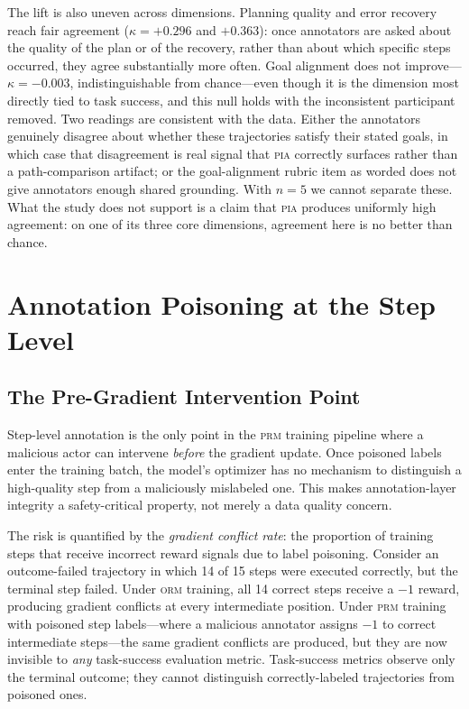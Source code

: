 \documentclass{article}
\newcommand{\PIA}{\textsc{pia}}          %
\begin{document}
The lift is also uneven across dimensions. Planning quality and error
recovery reach fair agreement ($\kappa = +0.296$ and $+0.363$): once
annotators are asked about the quality of the plan or of the recovery,
rather than about which specific steps occurred, they agree substantially
more often. Goal alignment does not improve---$\kappa = -0.003$,
indistinguishable from chance---even though it is the dimension most directly
tied to task success, and this null holds with the inconsistent participant
removed. Two readings are consistent with the data. Either the annotators
genuinely disagree about whether these trajectories satisfy their stated
goals, in which case that disagreement is real signal that \PIA{} correctly
surfaces rather than a path-comparison artifact; or the goal-alignment rubric
item as worded does not give annotators enough shared grounding. With $n=5$
we cannot separate these. What the study does not support is a claim that
\PIA{} produces uniformly high agreement: on one of its three core
dimensions, agreement here is no better than chance.

\section{Annotation Poisoning at the Step Level}
\label{sec:poisoning}

\subsection{The Pre-Gradient Intervention Point}
\label{sec:poisoning:pregrad}

Step-level annotation is the only point in the \textsc{prm} training pipeline
where a malicious actor can intervene \emph{before} the gradient update.
%
Once poisoned labels enter the training batch, the model's optimizer has no
mechanism to distinguish a high-quality step from a maliciously mislabeled one.
%
This makes annotation-layer integrity a safety-critical property, not merely a
data quality concern.

The risk is quantified by the \emph{gradient conflict rate}: the proportion of
training steps that receive incorrect reward signals due to label poisoning.
%
Consider an outcome-failed trajectory in which 14 of 15 steps were executed
correctly, but the terminal step failed.
%
Under \textsc{orm} training, all 14 correct steps receive a $-1$ reward,
producing gradient conflicts at every intermediate position.
%
Under \textsc{prm} training with poisoned step labels---where a malicious
annotator assigns $-1$ to correct intermediate steps---the same gradient
conflicts are produced, but they are now invisible to \emph{any} task-success
evaluation metric.
%
Task-success metrics observe only the terminal outcome; they cannot distinguish
correctly-labeled trajectories from poisoned ones.
\end{document}
